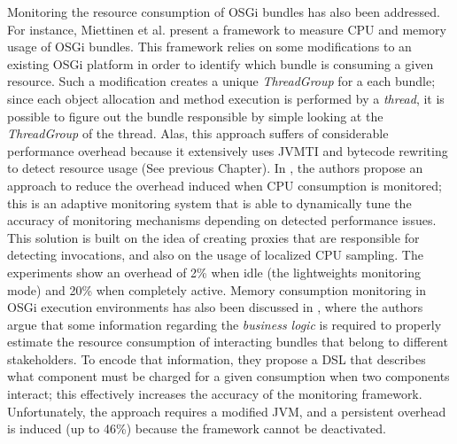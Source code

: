 Monitoring the resource consumption of OSGi bundles has also been addressed.
For instance, Miettinen et al. \cite{Miettinen2008} present a framework to measure CPU and memory usage of OSGi bundles.
This framework relies on some modifications to an existing OSGi platform in order to identify which bundle is consuming a given resource.
Such a modification creates a unique \textit{ThreadGroup} for a each bundle; since each object allocation and method execution is performed by a \textit{thread}, it is possible to figure out the bundle responsible by simple looking at the \textit{ThreadGroup} of the thread.
Alas, this approach suffers of considerable performance overhead because it extensively uses JVMTI and bytecode rewriting to detect resource usage (See previous Chapter).
In \cite{Maurel:2012:AME:2304736.2304763}, the authors propose an approach to reduce the overhead induced when CPU consumption is monitored; this is an adaptive monitoring system that is able to dynamically tune the accuracy of monitoring mechanisms depending on detected performance issues.
This solution is built on the idea of creating proxies that are responsible for detecting invocations, and also on the usage of localized CPU sampling.
The experiments show an overhead of 2\% when idle (the lightweights monitoring mode) and 20\% when completely active.
Memory consumption monitoring in OSGi execution environments has also been discussed in \cite{Attouchi:2014:MMM:2602458.2602467}, where the authors argue that some information regarding the \textit{business logic} is required to properly estimate the resource consumption of interacting bundles that belong to different stakeholders. 
To encode that information, they propose a DSL that describes what component must be charged for a given consumption when two components interact; this effectively increases the accuracy of the monitoring framework.
Unfortunately, the approach requires a modified JVM, and a persistent overhead is induced (up to 46\%) because the framework cannot be deactivated.

